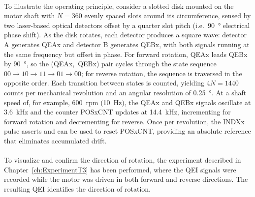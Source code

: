 \documentclass[12pt, oneside, a4paper]{scrreprt}
\begin{document}
            \paragraph{} To illustrate the operating principle, consider a slotted disk mounted on the motor shaft with $N = 360$ evenly spaced slots around its circumference, sensed by two laser-based optical detectors offset by a quarter slot pitch (i.e.\ \SI{90}{\degree} electrical phase shift). As the disk rotates, each detector produces a square wave: detector A generates QEAx and detector B generates QEBx, with both signals running at the same frequency but offset in phase. For forward rotation, QEAx leads QEBx by \SI{90}{\degree}, so the (QEAx,~QEBx) pair cycles through the state sequence $00 \rightarrow 10 \rightarrow 11 \rightarrow 01 \rightarrow 00$; for reverse rotation, the sequence is traversed in the opposite order. Each transition between states is counted, yielding $4N = 1440$ counts per mechanical revolution and an angular resolution of \SI{0.25}{\degree}. At a shaft speed of, for example, \SI{600}{rpm} (\SI{10}{\hertz}), the QEAx and QEBx signals oscillate at \SI{3.6}{\kilo\hertz} and the counter POSxCNT updates at \SI{14.4}{\kilo\hertz}, incrementing for forward rotation and decrementing for reverse. Once per revolution, the INDXx pulse asserts and can be used to reset POSxCNT, providing an absolute reference that eliminates accumulated drift.

            \paragraph{}To visualize and confirm the direction of rotation, the experiment described in Chapter~\ref{ch:ExperimentT3} has been performed, where the QEI signals were recorded while the motor was driven in both forward and reverse directions. The resulting QEI identifies the direction of rotation.
            
\end{document}
